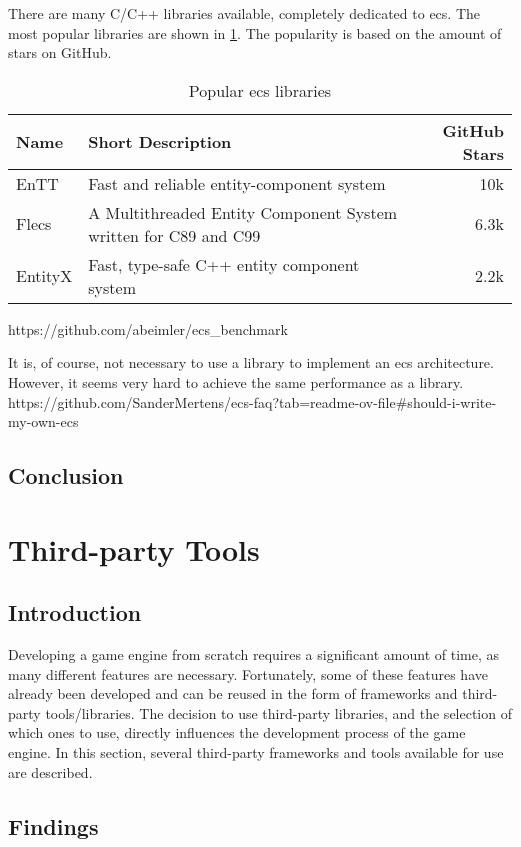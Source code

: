 \documentclass{projdoc}
\begin{document}
There are many C/C++ libraries available, completely dedicated to \gls{ecs}. The most
popular libraries are shown in \cref{tab:popularECSLibraries}. The popularity is based
on the amount of stars on GitHub.
\begin{table}
	\begin{tabularx}{\linewidth}{lXr}
		\toprule
		\textbf{Name} & \textbf{Short Description} & \textbf{GitHub Stars} \\
		\midrule
		EnTT & Fast and reliable entity-component system & 10k \\
		Flecs & A Multithreaded Entity Component System written for C89 and C99 & 6.3k \\
		EntityX & Fast, type-safe C++ entity component system & 2.2k \\
		\bottomrule
	\end{tabularx}
	\caption{Popular \gls{ecs} libraries}
	\label{tab:popularECSLibraries}
\end{table}
https://github.com/abeimler/ecs_benchmark

It is, of course, not necessary to use a library to implement an \gls{ecs} architecture.
However, it seems very hard to achieve the same performance as a library. https://github.com/SanderMertens/ecs-faq?tab=readme-ov-file#should-i-write-my-own-ecs

\subsection{Conclusion}

\section{Third-party Tools}

\subsection{Introduction}

Developing a game engine from scratch requires a significant amount of time, as many
different features are necessary. Fortunately, some of these features have already
been developed and can be reused in the form of frameworks and third-party
tools/libraries. The decision to use third-party libraries, and the selection of
which ones to use, directly influences the development process of the game engine. In
this section, several third-party frameworks and tools available for use are
described.

\subsection{Findings}
\end{document}
